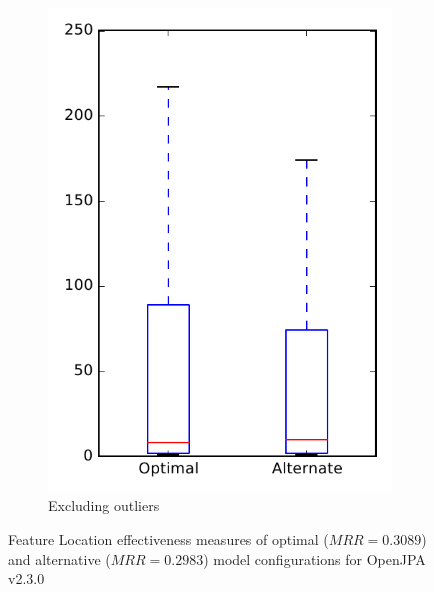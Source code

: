 \begin{figure}
\begin{subfigure}{.4\textwidth}
        \includegraphics[height=0.4\textheight]{figures/combo/flt_rq1_openjpa_no_outlier}
        \caption{Excluding outliers}\label{fig:combo:flt:rq1:openjpa_no_outlier}
    \end{subfigure}
\caption[Feature Location effectiveness measures of optimal and alternative model configurations for OpenJPA v2.3.0]%
{Feature Location effectiveness measures of optimal ($MRR=0.3089$) and alternative ($MRR=0.2983$) model configurations for OpenJPA v2.3.0}
\label{fig:combo:flt:rq1:openjpa}
\end{figure}
